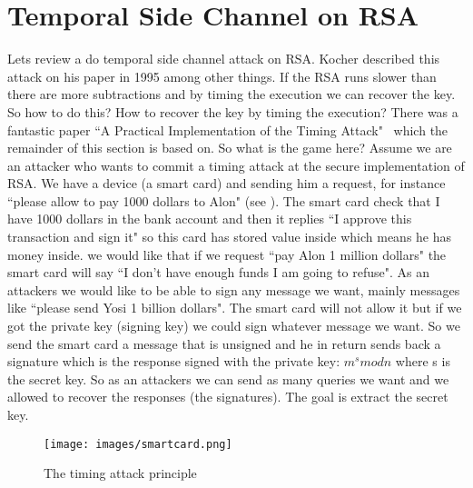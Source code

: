 \section{Temporal Side Channel on RSA}\label{sec:Temporal Side Channel on RSA}

Lets review a do temporal side channel attack on RSA. Kocher described this
attack on his paper in 1995 among other things. If the RSA runs slower than
there are more subtractions and by timing the execution we can recover the key.
So how to do this? How to recover the key by timing the execution? There was a
fantastic paper ``A Practical Implementation of the Timing
Attack"~\cite{dhem1998practical} which the remainder of this section is based
on. So what is the game here? Assume we are an attacker who wants to commit a
timing attack at the secure implementation of RSA. We have a device (a smart
card) and sending him a request, for instance ``please allow to pay 1000 dollars
to Alon" (see ). The smart card check that I have 1000
dollars in the bank account and then it replies ``I approve this transaction and
sign it" so this card has stored value inside which means he has money inside.
we would like that if we request ``pay Alon 1 million dollars" the smart card
will say ``I don't have enough funds I am going to refuse". As an attackers we
would like to be able to sign any message we want, mainly messages like ``please
send Yosi 1 billion dollars". The smart card will not allow it but if we got the
private key (signing key) we could sign whatever message we want. So we send the
smart card a message that is unsigned and he in return sends back a signature
which is the response signed with the private key: \(m^s mod n\) where s is the
secret key. So as an attackers we can send as many queries we want and we
allowed to recover the responses (the signatures). The goal is extract the
secret key. 

\begin{figure}[!ht]
    \centering
    \texttt{[image: images/smartcard.png]}
    \caption{The timing attack principle} \label{fig:smart card}
\end{figure}


